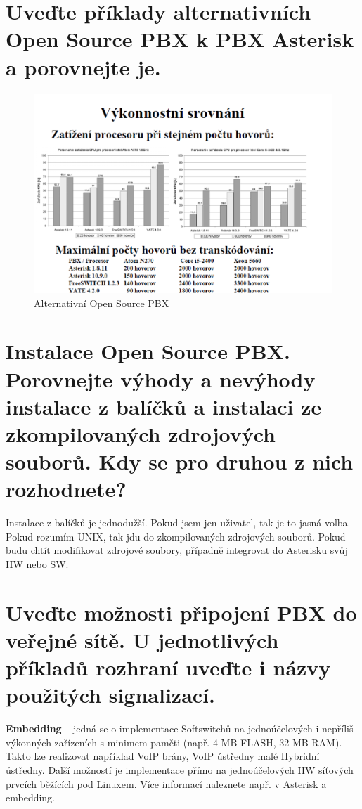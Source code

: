 \section{Uveďte příklady alternativních Open Source PBX k PBX Asterisk a porovnejte je.}

\begin{figure}[h!]
    \begin{center}
        \includegraphics[width=\textwidth]{images/otazka9.png}
        \caption{Alternativní Open Source PBX}
        \label{img:4}
    \end{center}
\end{figure}

\section{Instalace Open Source PBX. Porovnejte výhody a nevýhody instalace z balíčků a instalaci ze zkompilovaných zdrojových souborů. Kdy se pro druhou z nich rozhodnete?}

Instalace z balíčků je jednodužší. Pokud jsem jen uživatel, tak je to jasná volba.
Pokud rozumím UNIX, tak jdu do zkompilovaných zdrojových souborů. Pokud budu chtít modifikovat zdrojové soubory, případně integrovat do Asterisku svůj HW nebo SW.

\section{Uveďte možnosti připojení PBX do veřejné sítě. U jednotlivých příkladů rozhraní uveďte i názvy použitých signalizací.}

\textbf{Embedding} -- jedná se o implementace Softswitchů na jednoúčelových i nepříliš výkonných zařízeních s minimem paměti (např. 4 MB FLASH, 32 MB RAM). Takto lze realizovat například VoIP brány, VoIP ústředny malé Hybridní ústředny. Další možností je implementace přímo na jednoúčelových HW síťových prvcích běžících pod Linuxem. Více informací naleznete např. v Asterisk a embedding.

